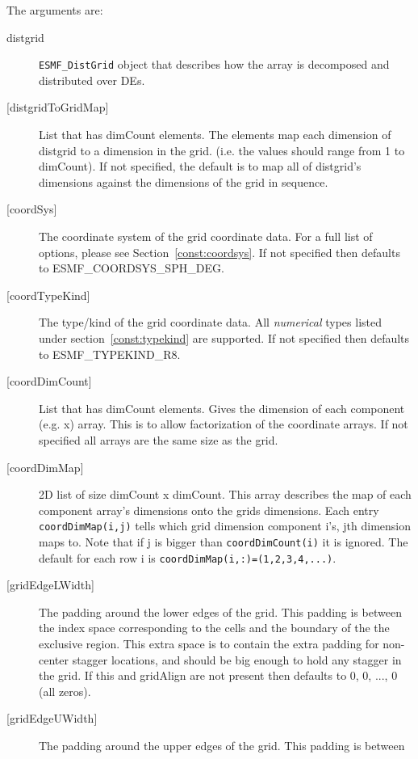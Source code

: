    The arguments are:
   \begin{description}
   \item[distgrid]
        {\tt ESMF\_DistGrid} object that describes how the array is decomposed and
        distributed over DEs.
   \item[{[distgridToGridMap]}]
        List that has dimCount elements.
        The elements map each dimension of distgrid to a dimension in the grid.
         (i.e. the values should range from 1 to dimCount). If not specified, the default
         is to map all of distgrid's dimensions against the dimensions of the
         grid in sequence.
   \item[{[coordSys]}]
       The coordinate system of the grid coordinate data.
       For a full list of options, please see Section~\ref{const:coordsys}.
       If not specified then defaults to ESMF\_COORDSYS\_SPH\_DEG.
   \item[{[coordTypeKind]}]
       The type/kind of the grid coordinate data. All {\em numerical} types
       listed under section~\ref{const:typekind} are supported.
       If not specified then defaults to ESMF\_TYPEKIND\_R8.
   \item[{[coordDimCount]}]
        List that has dimCount elements.
        Gives the dimension of each component (e.g. x) array. This is
        to allow factorization of the coordinate arrays. If not specified
        all arrays are the same size as the grid.
   \item[{[coordDimMap]}]
        2D list of size dimCount x  dimCount. This array describes the
        map of each component array's dimensions onto the grids
        dimensions. Each entry {\tt coordDimMap(i,j)} tells which
        grid dimension component i's, jth dimension maps to.
        Note that if j is bigger than {\tt coordDimCount(i)} it is ignored.
        The default for each row i is {\tt coordDimMap(i,:)=(1,2,3,4,...)}.
   \item[{[gridEdgeLWidth]}]
        The padding around the lower edges of the grid. This padding is between
        the index space corresponding to the cells and the boundary of the
        the exclusive region. This extra space is to contain the extra
        padding for non-center stagger locations, and should be big enough
        to hold any stagger in the grid. If this and gridAlign are not present then
        defaults to 0, 0, ..., 0 (all zeros).
   \item[{[gridEdgeUWidth]}]
        The padding around the upper edges of the grid. This padding is between

\end{description}
